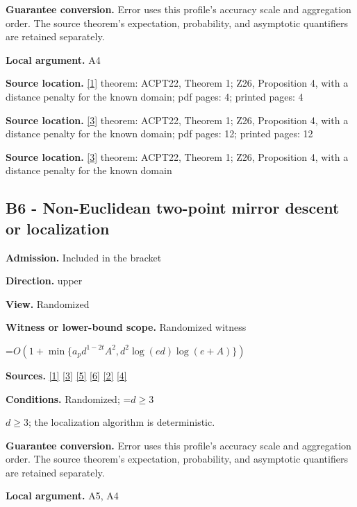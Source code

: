 \documentclass[10pt,a4paper]{article}
\newcommand{\AtlasMath}[1]{\par\begingroup\centering\setbox0=\hbox{$\displaystyle #1$}\ifdim\wd0>1.4\linewidth\typeout{ATLAS WIDE FORMULA: \the\wd0}\fi\ifdim\wd0>\linewidth\resizebox{\linewidth}{!}{\box0}\else\box0\fi\par\endgroup}
\newcommand{\AtlasInlineMath}[1]{\begingroup\setbox0=\hbox{$#1$}\ifdim\wd0>.4\linewidth\endgroup\AtlasMath{#1}\else\endgroup$#1$\fi}
\begin{document}
\textbf{Guarantee conversion.} Error uses this profile's accuracy scale and aggregation order. The source theorem's expectation, probability, and asymptotic quantifiers are retained separately.

\textbf{Local argument.} A4

\textbf{Source location.} \href{https://proceedings.neurips.cc/paper_files/paper/2022/file/329ef22fd8cb68223d5df09a037f7dd9-Paper-Conference.pdf}{[1]} theorem: ACPT22, Theorem 1; Z26, Proposition 4, with a distance penalty for the known domain; pdf pages: 4; printed pages: 4

\textbf{Source location.} \href{https://arxiv.org/html/2607.16558v2}{[3]} theorem: ACPT22, Theorem 1; Z26, Proposition 4, with a distance penalty for the known domain; pdf pages: 12; printed pages: 12

\textbf{Source location.} \href{https://arxiv.org/html/2607.16558v2}{[3]} theorem: ACPT22, Theorem 1; Z26, Proposition 4, with a distance penalty for the known domain

\subsection{B6 - Non-Euclidean two-point mirror descent or localization}
\textbf{Admission.} Included in the bracket

\textbf{Direction.} upper

\textbf{View.} Randomized

\textbf{Witness or lower-bound scope.} Randomized witness

\AtlasMath{O\!\left(1+\min\{a_p d^{1-2t}A^2,d^2\log(ed)\log(e+A)\}\right)}
\textbf{Sources.} \href{https://proceedings.neurips.cc/paper_files/paper/2022/file/329ef22fd8cb68223d5df09a037f7dd9-Paper-Conference.pdf}{[1]} \href{https://arxiv.org/html/2607.16558v2}{[3]} \href{https://arxiv.org/abs/1802.09022}{[5]} \href{https://jmlr.org/papers/volume18/16-632/16-632.pdf}{[6]} \href{https://arxiv.org/html/2610.00345v1}{[2]} \href{https://www.mathnet.ru/php/archive.phtml?jrnid=mzm&option_lang=eng&paperid=1697&wshow=paper}{[4]}

\textbf{Conditions.} Randomized; \AtlasInlineMath{d\ge3}; the localization algorithm is deterministic.

\textbf{Guarantee conversion.} Error uses this profile's accuracy scale and aggregation order. The source theorem's expectation, probability, and asymptotic quantifiers are retained separately.

\textbf{Local argument.} A5, A4
\end{document}
